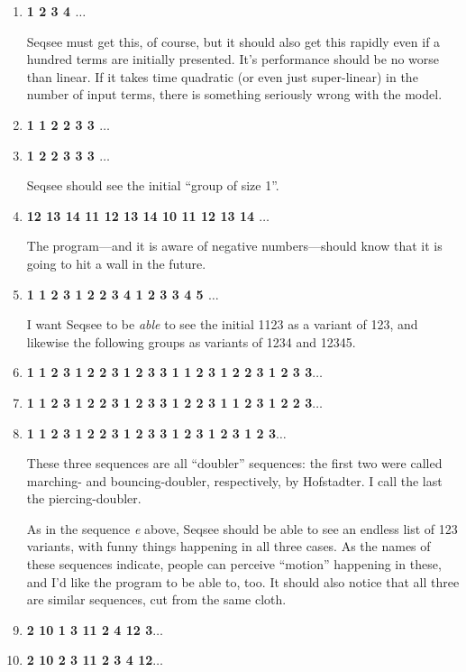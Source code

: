 \documentclass[letterpaper]{article}
\begin{document}
\renewcommand{\theenumi}{\alph{enumi}}
\begin{enumerate}
\item \textbf{1 2 3 4 $\ldots$}

Seqsee must get this, of course, but it should also get this rapidly even if a hundred terms are initially presented. It's performance should be no worse than linear. If it takes time quadratic (or even just super-linear) in the number of input terms, there is something seriously wrong with the model.

\item \textbf{ 1 1 2 2 3 3 $\ldots$}
\item \textbf{ 1 2 2 3 3 3 $\ldots$}

Seqsee should see the initial ``group of size 1''.

\item \textbf{12 13 14 11 12 13 14 10 11 12 13 14 $\ldots$}

The program---and it is aware of negative numbers---should know that it is going to hit a wall in the future.

\item \textbf{1 1 2 3 1 2 2 3 4 1 2 3 3 4 5 $\ldots$}

I want Seqsee to be \emph{able} to see the initial 1123 as a variant of 123, and likewise the following groups as variants of 1234 and 12345.

\item \textbf{1 1 2 3 1 2 2 3 1 2 3 3 1 1 2 3 1 2 2 3 1 2 3 3$\ldots$}
\item \textbf{1 1 2 3 1 2 2 3 1 2 3 3 1 2 2 3 1 1 2 3 1 2 2 3$\ldots$}
\item \textbf{1 1 2 3 1 2 2 3 1 2 3 3 1 2 3 1 2 3 1 2 3$\ldots$}

These three sequences are all ``doubler'' sequences: the first two were called marching- and bouncing-doubler, respectively, by Hofstadter. I call the last the piercing-doubler.

As in the sequence \emph{e} above, Seqsee should be able to see an endless list of 123 variants, with funny things happening in all three cases. As the names of these sequences indicate, people can perceive ``motion'' happening in these, and I'd like the program to be able to, too. It should also notice that all three are similar sequences, cut from the same cloth.

\item \textbf{ 2 10 1 3 11 2 4 12 3$\ldots$}
\item \textbf{ 2 10 2 3 11 2 3 4 12$\ldots$}


\end{enumerate}
\end{document}
